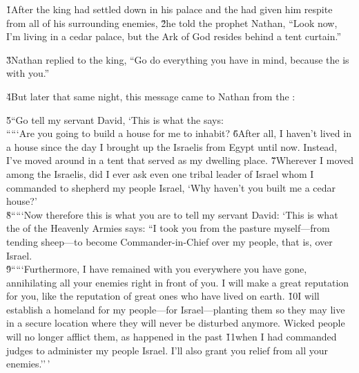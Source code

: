 \v{1}After the king had settled down in his palace and the  had given him respite from all of his surrounding enemies, \v{2}he told the prophet Nathan, ``Look now, I'm living in a cedar palace, but the Ark of God resides behind a tent curtain.''

\v{3}Nathan replied to the king, ``Go do everything you have in mind, because the  is with you.''

\v{4}But later that same night, this message came to Nathan from the :

\begin{poetry}
\poeml \v{5}``Go tell my servant David, `This is what the  says: \\
\poeml `````Are you going to build a house for me to inhabit? \v{6}After all, I haven't lived in a house since the day I brought up the Israelis from Egypt until now. Instead, I've moved around in a tent that served as my dwelling place. \v{7}Wherever I moved among the Israelis, did I ever ask even one tribal leader of Israel whom I commanded to shepherd my people Israel, `Why haven't you built me a cedar house?' \\
\poeml \v{8}`````Now therefore this is what you are to tell my servant David: `This is what the  of the Heavenly Armies says: ``I took you from the pasture myself---from tending sheep---to become Commander-in-Chief over my people, that is, over Israel. \\
\poeml \v{9}`````Furthermore, I have remained with you everywhere you have gone, annihilating all your enemies right in front of you. I will make a great reputation for you, like the reputation of great ones who have lived on earth. \v{10}I will establish a homeland for my people---for Israel---planting them so they may live in a secure location where they will never be disturbed anymore. Wicked people will no longer afflict them, as happened in the past \v{11}when I had commanded judges to administer my people Israel. I'll also grant you relief from all your enemies.''\,' \\

\end{poetry}
